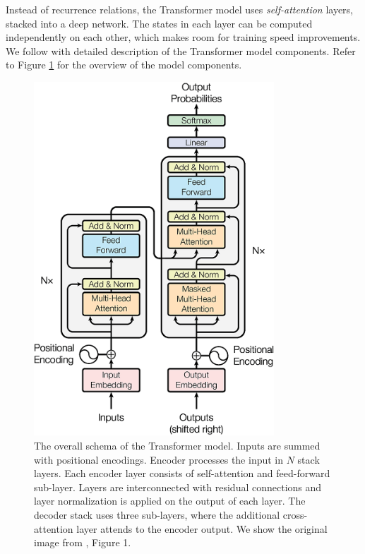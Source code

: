 Instead of recurrence relations, the Transformer model uses
\emph{self-attention} layers, stacked into a deep network. The states in each
layer can be computed independently on each other, which makes room for
training speed improvements. We follow with detailed description of the
Transformer model components. Refer to Figure \ref{fig:transformer} for
the overview of the model components.

\begin{figure}
  \centering
  \includegraphics[width=9cm]{img/transformer.png}

  \caption{The overall schema of the Transformer model. Inputs are summed with
    positional encodings. Encoder processes the input in $N$ stack layers. Each
    encoder layer consists of self-attention and feed-forward sub-layer. Layers
    are interconnected with residual connections and layer normalization is
    applied on the output of each layer. The decoder stack uses three
    sub-layers, where the additional cross-attention layer attends to the
    encoder output. We show the original image from
    \citet{vaswani2017attention}, Figure 1.}
  \label{fig:transformer}
\end{figure}

